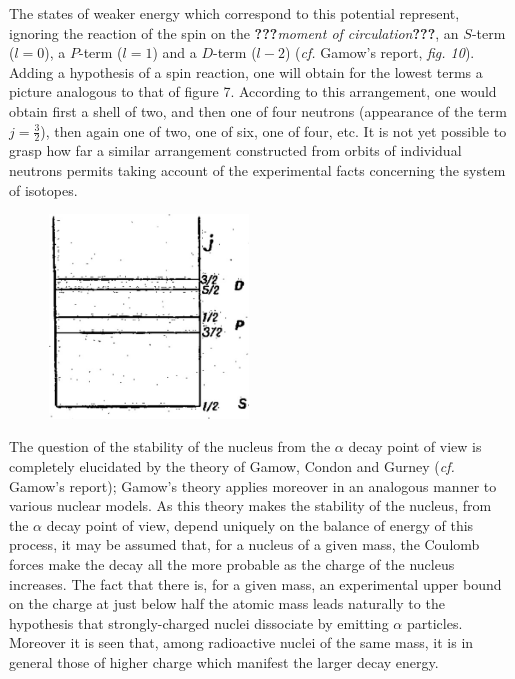\documentclass[a4paper,11pt]{article}
\newcommand{\WTF}[1]{\textbf{???}\textit{#1}\textbf{???}}
\newcommand{\?}[2]{#1\footnote{\textsc{Translator note}: #2}}
\begin{document}
{{\begin{figure}[h!]
\end{figure}
The states of weaker energy which correspond to this potential represent, ignoring the reaction of the spin on the \WTF{moment of circulation}, an $S$-term ($l=0$), a $P$-term ($l=1$) and a $D$-term ($l-2$) (\textit{cf.} Gamow's report, \textit{fig. 10}). Adding a hypothesis of a spin reaction, one will obtain for the lowest terms a picture analogous to that of figure 7. According to this arrangement, one would obtain first a shell of two, and then one of four neutrons (appearance of the term $j=\frac{3}{2}$), then again one of two, one of six, one of four, etc. It is not yet possible to grasp how far a similar arrangement constructed from orbits of individual neutrons permits taking account of the experimental facts concerning the system of isotopes.
\begin{figure}[h!]
\centering
\includegraphics[width=150pt]{images/Fig7}
\end{figure}
The question of the stability of the nucleus from the $\alpha$ decay point of view is completely elucidated by the theory of Gamow, Condon and Gurney (\textit{cf.} Gamow's report); Gamow's theory applies moreover in an analogous manner to various nuclear models. As this theory makes the stability of the nucleus, from the $\alpha$ decay point of view, depend uniquely on the balance of energy of this process, it may be assumed that, for a nucleus of a given mass, the Coulomb forces make the decay all the more probable as the charge of the nucleus increases. The fact that there is, for a given mass, an experimental upper bound on the charge at just below half the atomic mass leads naturally to the hypothesis that strongly-charged nuclei dissociate by emitting $\alpha$ particles. Moreover it is seen that, among radioactive nuclei of the same mass, it is in general those of higher charge which manifest the larger decay energy.

}}
\end{document}
